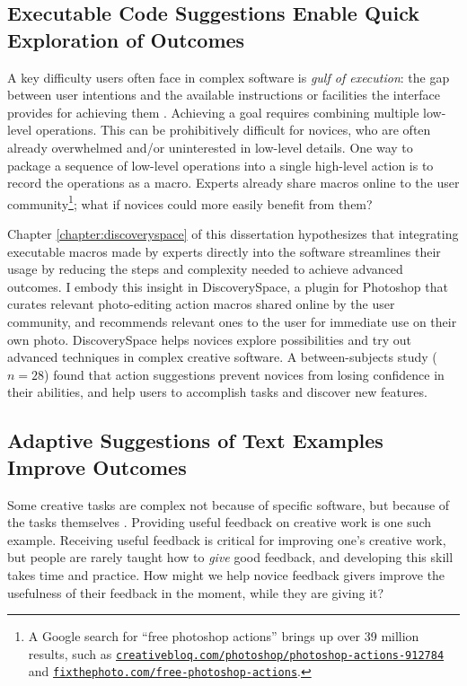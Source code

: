 \subsection{Executable Code Suggestions Enable Quick Exploration of Outcomes}
A key difficulty users often face in complex software is \textit{gulf of execution}: the gap between user intentions and the available instructions or facilities the interface provides for achieving them \cite{Hutchins1985}. Achieving a goal requires combining multiple low-level operations. This can be prohibitively difficult for novices, who are often already overwhelmed and/or uninterested in low-level details. One way to package a sequence of low-level operations into a single high-level action is to record the operations as a macro. Experts already share macros online to the user community\footnote{A Google search for ``free photoshop actions'' brings up over 39 million results, such as \href{https://www.creativebloq.com/photoshop/photoshop-actions-912784}{\nolinkurl{creativebloq.com/photoshop/photoshop-actions-912784}} and \href{https://fixthephoto.com/free-photoshop-actions}{\nolinkurl{fixthephoto.com/free-photoshop-actions}}.}; what if novices could more easily benefit from them?

Chapter \ref{chapter:discoveryspace} of this dissertation hypothesizes that integrating executable macros made by experts directly into the software streamlines their usage by reducing the steps and complexity needed to achieve advanced outcomes. I embody this insight in DiscoverySpace, a plugin for Photoshop that curates relevant photo-editing action macros shared online by the user community, and recommends relevant ones to the user for immediate use on their own photo. DiscoverySpace helps novices explore possibilities and try out advanced techniques in complex creative software. A between-subjects study ($n=28$) found that action suggestions prevent novices from losing confidence in their abilities, and help users to accomplish tasks and discover new features.

\subsection{Adaptive Suggestions of Text Examples Improve Outcomes}
Some creative tasks are complex not because of specific software, but because of the tasks themselves \cite{Brooks1987}. Providing useful feedback on creative work is one such example. Receiving useful feedback is critical for improving one's creative work, but people are rarely taught how to \textit{give} good feedback, and developing this skill takes time and practice. How might we help novice feedback givers improve the usefulness of their feedback in the moment, while they are giving it?

